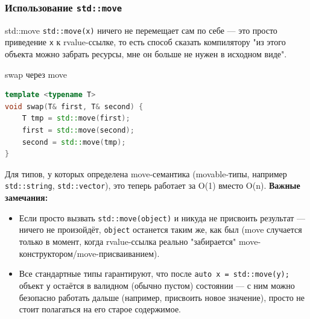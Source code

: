 \subsubsection{Использование \texttt{std::move}}
\begin{definition}{std::move}{}
\texttt{std::move(x)} ничего не перемещает сам по себе --- это просто приведение \texttt{x} к rvalue-ссылке, то есть способ сказать компилятору "из этого объекта можно забрать ресурсы, мне он больше не нужен в исходном виде".
\end{definition}
\begin{implementation}{swap через move}{}
\begin{lstlisting}[language=C++]
template <typename T>
void swap(T& first, T& second) {
    T tmp = std::move(first);
    first = std::move(second);
    second = std::move(tmp);
}
\end{lstlisting}
\end{implementation}
Для типов, у которых определена move-семантика (movable-типы, например \texttt{std::string}, \texttt{std::vector}), это теперь работает за O(1) вместо O(n).
\textbf{Важные замечания:}
\begin{itemize}
  \item Если просто вызвать \texttt{std::move(object)} и никуда не присвоить результат --- ничего не произойдёт, \texttt{object} останется таким же, как был (move случается только в момент, когда rvalue-ссылка реально "забирается" move-конструктором/move-присваиванием).
  \item Все стандартные типы гарантируют, что после \texttt{auto x = std::move(y);} объект \texttt{y} остаётся в валидном (обычно пустом) состоянии --- с ним можно безопасно работать дальше (например, присвоить новое значение), просто не стоит полагаться на его старое содержимое.
\end{itemize}
